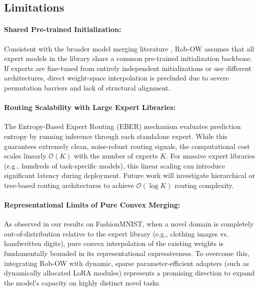 \documentclass{article}
\begin{document}
\subsection{Limitations}
\paragraph{Shared Pre-trained Initialization:} Consistent with the broader model merging literature \cite{matena2022merging, yadav2023ties}, Rob-OW assumes that all expert models in the library share a common pre-trained initialization backbone. If experts are fine-tuned from entirely independent initializations or use different architectures, direct weight-space interpolation is precluded due to severe permutation barriers and lack of structural alignment.

\paragraph{Routing Scalability with Large Expert Libraries:} The Entropy-Based Expert Routing (EBER) mechanism evaluates prediction entropy by running inference through each standalone expert. While this guarantees extremely clean, noise-robust routing signals, the computational cost scales linearly $\mathcal{O}(K)$ with the number of experts $K$. For massive expert libraries (e.g., hundreds of task-specific models), this linear scaling can introduce significant latency during deployment. Future work will investigate hierarchical or tree-based routing architectures to achieve $\mathcal{O}(\log K)$ routing complexity.

\paragraph{Representational Limits of Pure Convex Merging:} As observed in our results on FashionMNIST, when a novel domain is completely out-of-distribution relative to the expert library (e.g., clothing images vs. handwritten digits), pure convex interpolation of the existing weights is fundamentally bounded in its representational expressiveness. To overcome this, integrating Rob-OW with dynamic, sparse parameter-efficient adapters (such as dynamically allocated LoRA modules) represents a promising direction to expand the model's capacity on highly distinct novel tasks.
\end{document}
